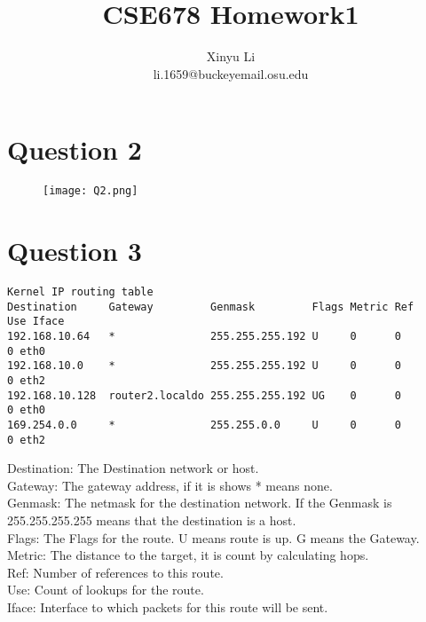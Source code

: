 \documentclass[a4paper,12pt]{article}
\begin{document}
\title{CSE678 Homework1}
\author{Xinyu Li\\li.1659@buckeyemail.osu.edu}
\maketitle
\section*{Question 2}
\begin{figure}[!htbp]
\texttt{[image: Q2.png]}
\end{figure}

\section*{Question 3}
\begin{verbatim}
Kernel IP routing table
Destination     Gateway         Genmask         Flags Metric Ref    Use Iface
192.168.10.64   *               255.255.255.192 U     0      0        0 eth0
192.168.10.0    *               255.255.255.192 U     0      0        0 eth2
192.168.10.128  router2.localdo 255.255.255.192 UG    0      0        0 eth0
169.254.0.0     *               255.255.0.0     U     0      0        0 eth2
\end{verbatim}
Destination: The Destination network or host.\\
Gateway: The gateway address, if it is shows * means none.\\
Genmask: The netmask for the destination network. If the Genmask is 255.255.255.255 means that the destination is a host.\\
Flags: The Flags for the route. U means route is up. G means the Gateway.\\
Metric: The distance to the target, it is count by calculating hops.\\
Ref: Number of references to this route.\\
Use: Count of lookups for the route.\\
Iface: Interface to which packets for this route will be sent.\\
\end{document}
